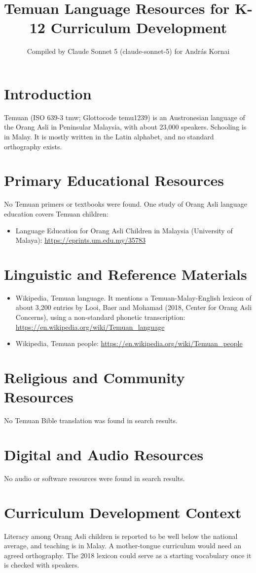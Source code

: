 \documentclass[12pt]{article}
\title{Temuan Language Resources for K-12 Curriculum Development}
\author{Compiled by Claude Sonnet 5 (claude-sonnet-5) for Andr\'as Kornai}
\date{}
\begin{document}
\maketitle

\section{Introduction}
Temuan (ISO 639-3 tmw; Glottocode temu1239) is an Austronesian language of the Orang Asli in Peninsular Malaysia, with about 23{,}000 speakers. Schooling is in Malay. It is mostly written in the Latin alphabet, and no standard orthography exists.

\section{Primary Educational Resources}
No Temuan primers or textbooks were found. One study of Orang Asli language education covers Temuan children:
\begin{itemize}
\item Language Education for Orang Asli Children in Malaysia (University of Malaya): \url{https://eprints.um.edu.my/35783}
\end{itemize}

\section{Linguistic and Reference Materials}
\begin{itemize}
\item Wikipedia, Temuan language. It mentions a Temuan-Malay-English lexicon of about 3{,}200 entries by Looi, Baer and Mohamad (2018, Center for Orang Asli Concerns), using a non-standard phonetic transcription: \url{https://en.wikipedia.org/wiki/Temuan_language}
\item Wikipedia, Temuan people: \url{https://en.wikipedia.org/wiki/Temuan_people}
\end{itemize}

\section{Religious and Community Resources}
No Temuan Bible translation was found in search results.

\section{Digital and Audio Resources}
No audio or software resources were found in search results.

\section{Curriculum Development Context}
Literacy among Orang Asli children is reported to be well below the national average, and teaching is in Malay. A mother-tongue curriculum would need an agreed orthography. The 2018 lexicon could serve as a starting vocabulary once it is checked with speakers.
\end{document}
